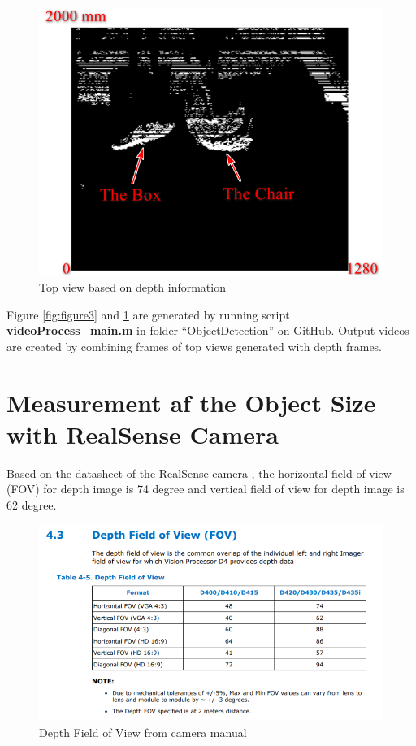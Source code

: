 \documentclass[
  oneside]{ubcthesis}
\begin{document}
\begin{figure}

{\centering \includegraphics[width=0.6\linewidth]{figures/4} 

}

\caption{Top view based on depth information}\label{fig:figure4}
\end{figure}



Figure \ref{fig:figure3} and \ref{fig:figure4} are generated by running script \textbf{\href{https://github.com/luckymeng7/EECE597/blob/master/ObjectDetection/videoProcess_main.m}{videoProcess\_main.m}} in folder ``ObjectDetection'' on GitHub. Output videos are created by combining frames of top views generated with depth frames.

\hypertarget{measurement-af-the-object-size-with-realsense-camera}{%
\section{Measurement af the Object Size with RealSense Camera}\label{measurement-af-the-object-size-with-realsense-camera}}

Based on the datasheet of the RealSense camera \citep{realSenseD400}, the horizontal field of view (FOV) for depth image is 74 degree and vertical field of view for depth image is 62 degree.

\begin{figure}

{\centering \includegraphics[width=0.8\linewidth]{figures/12} 

}

\caption{Depth Field of View from camera manual \citep{realSenseD400}}\label{fig:figure12}
\end{figure}
\end{document}
